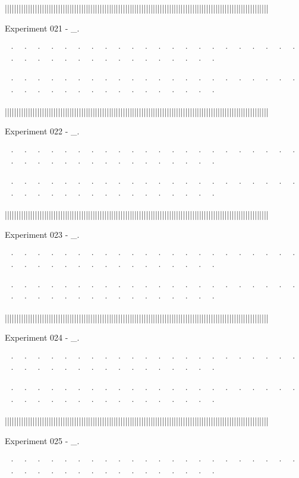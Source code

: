 ||||||||||||||||||||||||||||||||||||||||||||||||||||||||||||||||||||||||||||||||||||||||||||||||||||||||||||||||||


Experiment 021 - _. 


~· ~· ~· ~· ~· ~· ~· ~· ~· ~· ~· ~· ~· ~· ~· ~· ~· ~· ~· ~· ~· ~· ~· ~· ~· ~· ~· ~· ~· ~· ~· ~· ~· ~· ~· ~· ~· ~· 

~· ~· ~· ~· ~· ~· ~· ~· ~· ~· ~· ~· ~· ~· ~· ~· ~· ~· ~· ~· ~· ~· ~· ~· ~· ~· ~· ~· ~· ~· ~· ~· ~· ~· ~· ~· ~· ~· 



||||||||||||||||||||||||||||||||||||||||||||||||||||||||||||||||||||||||||||||||||||||||||||||||||||||||||||||||||


Experiment 022 - _. 


~· ~· ~· ~· ~· ~· ~· ~· ~· ~· ~· ~· ~· ~· ~· ~· ~· ~· ~· ~· ~· ~· ~· ~· ~· ~· ~· ~· ~· ~· ~· ~· ~· ~· ~· ~· ~· ~· 

~· ~· ~· ~· ~· ~· ~· ~· ~· ~· ~· ~· ~· ~· ~· ~· ~· ~· ~· ~· ~· ~· ~· ~· ~· ~· ~· ~· ~· ~· ~· ~· ~· ~· ~· ~· ~· ~· 



||||||||||||||||||||||||||||||||||||||||||||||||||||||||||||||||||||||||||||||||||||||||||||||||||||||||||||||||||


Experiment 023 - _. 


~· ~· ~· ~· ~· ~· ~· ~· ~· ~· ~· ~· ~· ~· ~· ~· ~· ~· ~· ~· ~· ~· ~· ~· ~· ~· ~· ~· ~· ~· ~· ~· ~· ~· ~· ~· ~· ~· 

~· ~· ~· ~· ~· ~· ~· ~· ~· ~· ~· ~· ~· ~· ~· ~· ~· ~· ~· ~· ~· ~· ~· ~· ~· ~· ~· ~· ~· ~· ~· ~· ~· ~· ~· ~· ~· ~· 



||||||||||||||||||||||||||||||||||||||||||||||||||||||||||||||||||||||||||||||||||||||||||||||||||||||||||||||||||


Experiment 024 - _. 


~· ~· ~· ~· ~· ~· ~· ~· ~· ~· ~· ~· ~· ~· ~· ~· ~· ~· ~· ~· ~· ~· ~· ~· ~· ~· ~· ~· ~· ~· ~· ~· ~· ~· ~· ~· ~· ~· 

~· ~· ~· ~· ~· ~· ~· ~· ~· ~· ~· ~· ~· ~· ~· ~· ~· ~· ~· ~· ~· ~· ~· ~· ~· ~· ~· ~· ~· ~· ~· ~· ~· ~· ~· ~· ~· ~· 



||||||||||||||||||||||||||||||||||||||||||||||||||||||||||||||||||||||||||||||||||||||||||||||||||||||||||||||||||


Experiment 025 - _. 


~· ~· ~· ~· ~· ~· ~· ~· ~· ~· ~· ~· ~· ~· ~· ~· ~· ~· ~· ~· ~· ~· ~· ~· ~· ~· ~· ~· ~· ~· ~· ~· ~· ~· ~· ~· ~· ~· 

